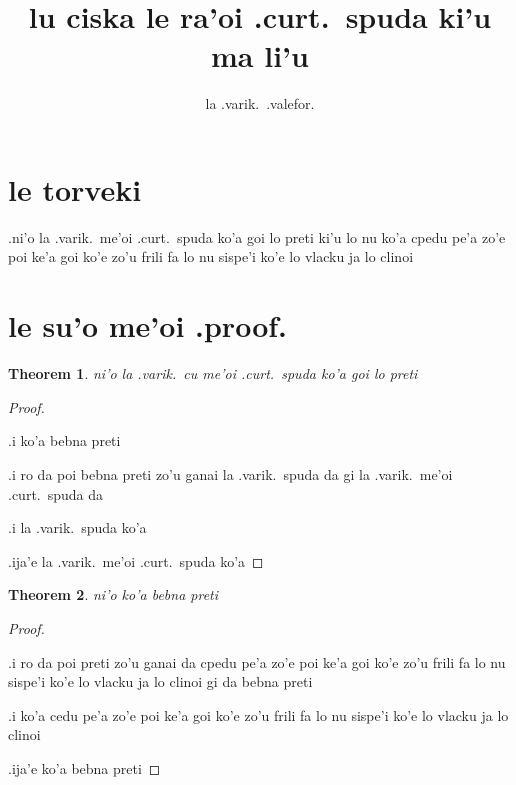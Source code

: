 \documentclass{article}
\title{lu ciska le ra'oi .curt.\ spuda ki'u ma li'u}
\author{la .varik.\ .valefor.}
\begin{document}
\newtheorem{thm}{Theorem}
\maketitle

\section{le torveki}
.ni'o la .varik.\ me'oi .curt.\ spuda ko'a goi lo preti ki'u lo nu ko'a cpedu pe'a zo'e poi ke'a goi ko'e zo'u frili fa lo nu sispe'i ko'e lo vlacku ja lo clinoi

\section{le su'o me'oi .proof.}
\begin{thm}
        ni'o la .varik.\ cu me'oi .curt.\ spuda ko'a goi lo preti
\end{thm}
\begin{proof}
        ${}$

        .i ko'a bebna preti

        .i ro da poi bebna preti zo'u ganai la .varik.\ spuda da gi la .varik.\ me'oi .curt.\ spuda da

	.i la .varik.\ spuda ko'a

	.ija'e la .varik.\ me'oi .curt.\ spuda ko'a
\end{proof}

\begin{thm}
        ni'o ko'a bebna preti
\end{thm}
\begin{proof}
	${}$

	.i ro da poi preti zo'u ganai da cpedu pe'a zo'e poi ke'a goi ko'e zo'u frili fa lo nu sispe'i ko'e lo vlacku ja lo clinoi gi da bebna preti

	.i ko'a cedu pe'a zo'e poi ke'a goi ko'e zo'u frili fa lo nu sispe'i ko'e lo vlacku ja lo clinoi

	.ija'e ko'a bebna preti
\end{proof}
\end{document}
